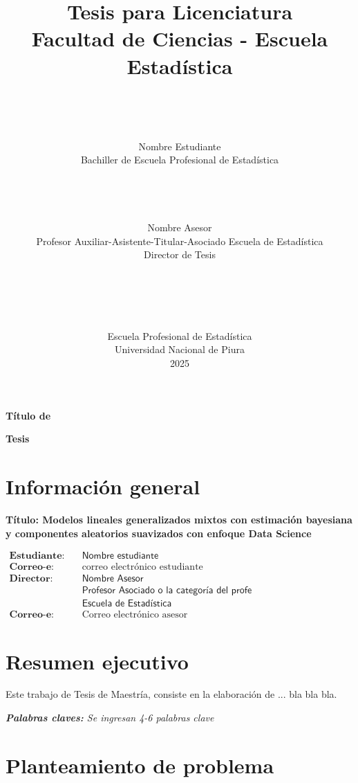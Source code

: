 \documentclass[12pt]{article}
\title{\textbf{Tesis para Licenciatura\\
		Facultad de Ciencias - Escuela Estadística}
		\author{\\\\\\Nombre Estudiante\\ \vspace{1.0cm}
			Bachiller de Escuela Profesional de Estadística\\\\\\\\\\
			Nombre Asesor\\
			Profesor Auxiliar-Asistente-Titular-Asociado Escuela de Estadística\\
			Director de Tesis\\\\\\\\\\\\
			Escuela Profesional de Estadística\\
			Universidad Nacional de Piura\\
			2025}
	}\date{}
\begin{document}
\maketitle
\newpage
\vspace{-0.5in}
\centerline{\bf{\large  Título de} }
\centerline{\bf{\large  Tesis}} %


\setlength{\parindent}{0pt}
\setlength{\parskip}{1ex plus 0.5ex minus 0.2ex} %


\tableofcontents

\section{Información general}
\textbf{Título: Modelos lineales generalizados mixtos con estimación bayesiana y componentes aleatorios suavizados con enfoque Data Science} 
\newline

$\begin{array}{llll}
\textbf{Estudiante:} & \quad \textsf{Nombre estudiante}\\
\textbf{Correo-e:} & \quad \textrm{correo electrónico estudiante}\\
\textbf{Director:} & \quad \textsf{Nombre Asesor}\\
& \quad \textsf{Profesor Asociado o la categoría del profe}\\
& \quad \textsf{Escuela de Estadística}\\
\textbf{Correo-e:} & \quad \textrm{Correo electrónico asesor}
\end{array}$

\section{Resumen ejecutivo}
Este trabajo de Tesis de Maestría, consiste en la elaboración de ... bla bla bla.

{\slshape \textbf{Palabras claves:} Se ingresan 4-6 palabras clave} 

\section{Planteamiento de problema}
\end{document}
